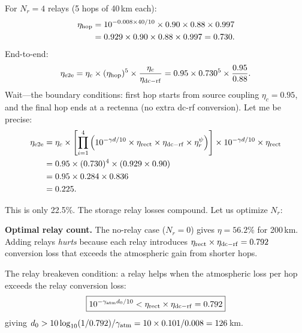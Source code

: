 \documentclass[aps,prd,twocolumn,superscriptaddress]{revtex4-2}
\begin{document}
For $N_r = 4$ relays (5 hops of 40\,km each):
\begin{align}
\eta_{\rm hop} &= 10^{-0.008\times40/10}\times0.90\times0.88\times0.997
\nonumber\\
&= 0.929\times0.90\times0.88\times0.997 = 0.730.
\end{align}
End-to-end:
\begin{equation}
\eta_{\rm e2e} = \eta_c\times(\eta_{\rm hop})^5\times\frac{\eta_c}{\eta_{\rm dc-rf}}
= 0.95\times0.730^5\times\frac{0.95}{0.88}.
\end{equation}
Wait---the boundary conditions: first hop starts from source coupling
$\eta_c = 0.95$, and the final hop ends at a rectenna (no extra
dc-rf conversion). Let me be precise:
\begin{align}
\eta_{\rm e2e} &= \eta_c\times\left[\prod_{i=1}^{4}
\left(10^{-\gamma d/10}\times\eta_{\rm rect}\times\eta_{\rm dc-rf}
\times\eta_r^\psi\right)\right]
\times 10^{-\gamma d/10}\times\eta_{\rm rect}
\nonumber\\
&= 0.95\times(0.730)^4\times(0.929\times0.90)
\nonumber\\
&= 0.95\times0.284\times0.836
\nonumber\\
&= 0.225.
\end{align}

This is only 22.5\%. The storage relay losses compound. Let us
optimize $N_r$:

\textbf{Optimal relay count.}
The no-relay case ($N_r = 0$) gives $\eta = 56.2\%$ for 200\,km.
Adding relays \emph{hurts} because each relay introduces
$\eta_{\rm rect}\times\eta_{\rm dc-rf} = 0.792$ conversion loss
that exceeds the atmospheric gain from shorter hops.

The relay breakeven condition: a relay helps when the atmospheric
loss per hop exceeds the relay conversion loss:
\begin{equation}
\boxed{
10^{-\gamma_{\rm atm} d_0/10} < \eta_{\rm rect}\times\eta_{\rm dc-rf}
= 0.792
}
\end{equation}
giving $d_0 > 10\log_{10}(1/0.792)/\gamma_{\rm atm} = 10\times0.101/0.008
= 126$\,km.
\end{document}
